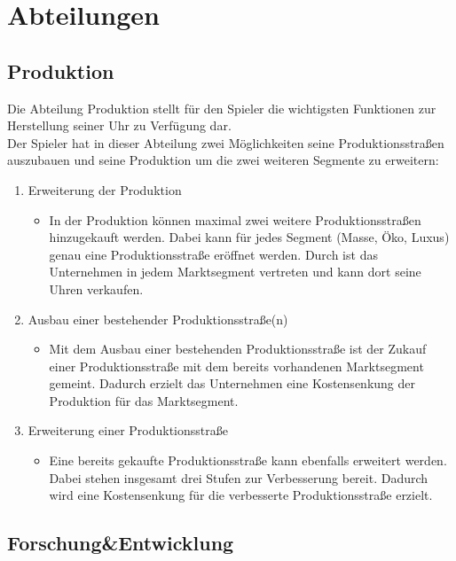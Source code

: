 \clearpage
\chapter{Abteilungen}
\section{Produktion}
Die Abteilung Produktion stellt für den Spieler die wichtigsten Funktionen zur Herstellung seiner Uhr zu Verfügung dar.\\ 
Der Spieler hat in dieser Abteilung zwei Möglichkeiten seine Produktionsstraßen auszubauen und seine Produktion um die zwei weiteren Segmente zu erweitern:
\begin{enumerate}
	\item Erweiterung der Produktion
\begin{itemize}
	\item In der Produktion können maximal zwei weitere Produktionsstraßen hinzugekauft werden. Dabei kann für jedes Segment (Masse, Öko, Luxus) genau eine Produktionsstraße eröffnet werden. Durch ist das Unternehmen in jedem Marktsegment vertreten und kann dort seine Uhren verkaufen.
\end{itemize}
	\item Ausbau einer bestehender Produktionsstraße(n)
\begin{itemize}
	\item Mit dem Ausbau einer bestehenden Produktionsstraße ist der Zukauf einer Produktionsstraße mit dem bereits vorhandenen Marktsegment gemeint. Dadurch erzielt das Unternehmen eine Kostensenkung der Produktion für das Marktsegment. 
\end{itemize}
	\item Erweiterung einer Produktionsstraße
\begin{itemize}
	\item Eine bereits gekaufte Produktionsstraße kann ebenfalls erweitert werden. Dabei stehen insgesamt drei Stufen zur Verbesserung bereit. Dadurch wird eine Kostensenkung für die verbesserte Produktionsstraße erzielt.   
\end{itemize}
\end{enumerate}
    
\section{Forschung\&Entwicklung}



